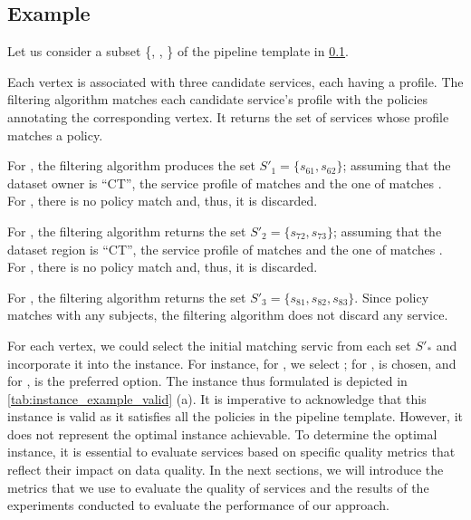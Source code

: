 \subsection{Example}\label{sec:example_instace}

\begin{example}[\bf \pipelineInstance]\label{ex:instance}

  Let us consider a subset \{, , \} of the pipeline template \tChartFunction in \cref{sec:example_instace}.

  Each vertex is associated with three candidate services, each having a profile. The filtering algorithm matches each candidate service's profile with the policies annotating the corresponding vertex. It returns the set of services whose profile matches a policy.
  \begin{enumerate*}[label=\textit{\roman*})]
    \item For , the filtering algorithm produces the set $S'_1=\{s_{61},s_{62}\}$; assuming that the dataset owner is ``CT'', the service profile of  matches  and the one of  matches .
          For , there is no policy match and, thus, it is discarded.
    \item For , the filtering algorithm returns the set $S'_2=\{s_{72},s_{73}\}$; assuming that the dataset region is ``CT'', the service profile of  matches  and the one of  matches .
          For , there is no policy match and, thus, it is discarded.
    \item For , the filtering algorithm returns the set $S'_3=\{s_{81},s_{82},s_{83}\}$. Since policy  matches with any subjects, the filtering algorithm does not discard any service.
  \end{enumerate*}

  For each vertex, we could select the initial matching servic from each set $S'_*$ and incorporate it into the instance.
  For instance, for , we select ; for ,  is chosen, and for ,  is the preferred option.
  The instance thus formulated is depicted in \cref{tab:instance_example_valid} (a).
  It is imperative to acknowledge that this instance is valid as it satisfies all the policies in the pipeline template.
  However, it does not represent the optimal instance achievable.
  To determine the optimal instance, it is essential to evaluate services based on specific quality metrics that reflect their impact on data quality.
  In the next sections, we will introduce the metrics that we use to evaluate the quality of services and the results of the experiments conducted to evaluate the performance of our approach.


\end{example}
